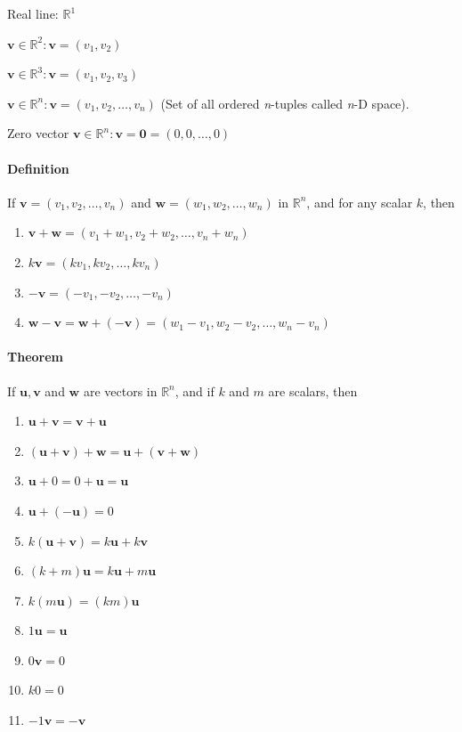 \documentclass[../linear-algebra.tex]{subfiles}
\begin{document}
\noindent Real line: $\mathbb{R}^1$

\noindent $\mathbf{v} \in \mathbb{R}^2: \mathbf{v} = (v_1, v_2)$

\noindent $\mathbf{v} \in \mathbb{R}^3: \mathbf{v} = (v_1, v_2, v_3)$

\noindent $\mathbf{v} \in \mathbb{R}^n: \mathbf{v} = (v_1, v_2, \ldots, v_n)$
(Set of all ordered \textit{n}-tuples called \textit{n}-D space).

\noindent Zero vector $\mathbf{v} \in \mathbb{R}^n: \mathbf{v} = \mathbf{0} = (0, 0, \ldots, 0)$ 

\paragraph{Definition}
If $\mathbf{v} = (v_1, v_2, \ldots, v_n)$ and $\mathbf{w} = (w_1, w_2, \ldots, w_n)$
in $\mathbb{R}^n$, and for any scalar $k$, then
\begin{enumerate}
    \item $\mathbf{v} + \mathbf{w} = (v_1 + w_1, v_2 + w_2, \ldots, v_n + w_n)$
    \item $k\mathbf{v} = (kv_1, kv_2, \ldots, kv_n)$
    \item $-\mathbf{v} = (-v_1, -v_2, \ldots, -v_n)$
    \item $\mathbf{w} - \mathbf{v} = \mathbf{w} + (-\mathbf{v})
    = (w_1 - v_1, w_2 - v_2, \ldots, w_n - v_n)$
\end{enumerate}

\paragraph{Theorem}
If $\mathbf{u}, \mathbf{v}$ and $\mathbf{w}$ are vectors in $\mathbb{R}^n$,
and if $k$ and $m$ are scalars, then
\begin{enumerate}
    \item $\mathbf{u} + \mathbf{v} = \mathbf{v} + \mathbf{u}$
    \item $(\mathbf{u} + \mathbf{v}) + \mathbf{w} = \mathbf{u} + (\mathbf{v} + \mathbf{w})$
    \item $\mathbf{u} + 0 = 0 + \mathbf{u} = \mathbf{u}$
    \item $\mathbf{u} + (-\mathbf{u}) = 0$
    \item $k(\mathbf{u} + \mathbf{v}) = k\mathbf{u} + k\mathbf{v}$
    \item $(k + m)\mathbf{u} = k\mathbf{u} + m\mathbf{u}$
    \item $k(m\mathbf{u}) = (km)\mathbf{u}$
    \item $1\mathbf{u} = \mathbf{u}$
    \item $0\mathbf{v} = 0$
    \item $k0 = 0$
    \item $-1\mathbf{v} = -\mathbf{v}$
\end{enumerate}
\end{document}
